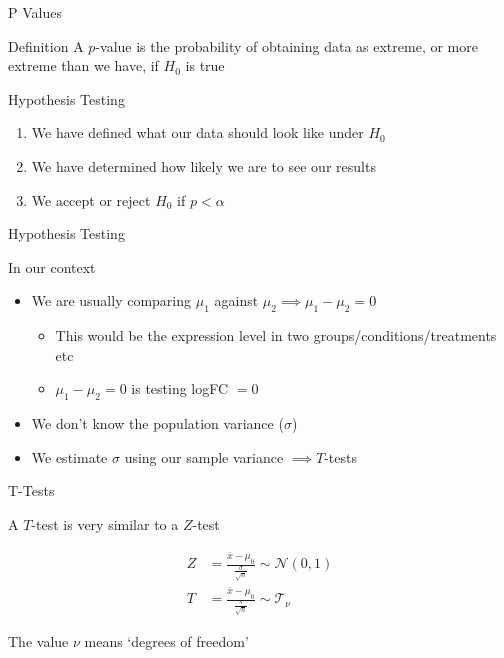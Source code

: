 \documentclass[aspectratio=169,11pt]{beamer}
\begin{document}
\begin{frame}{P Values}

	\begin{block}{Definition}
	A $p$-value is the probability of obtaining data as extreme, or more extreme than we have, if $H_0$ is true
	\end{block}

\end{frame}

\begin{frame}{Hypothesis Testing}

	\begin{enumerate}
		\item We have defined what our data should look like under $H_0$
		\item We have determined how likely we are to see our results
		\item We accept or reject $H_0$	if $p < \alpha$
	\end{enumerate}

\end{frame}

\begin{frame}{Hypothesis Testing}

In our context

	\begin{itemize}
		\item We are usually comparing $\mu_1$ against $\mu_2 \implies \mu_1 - \mu_2 = 0$
		\begin{itemize}
			\item This would be the expression level in two groups/conditions/treatments etc
			\item $\mu_1 - \mu_2 = 0$ is testing logFC $=0$
		\end{itemize}
		\pause
		\item We don't know the population variance ($\sigma$)
		\item We estimate $\sigma$ using our sample variance $\implies T$-tests
	\end{itemize}

\end{frame}

\begin{frame}{T-Tests}

A $T$-test is very similar to a $Z$-test

	\begin{align*}
		Z &= \frac{\bar{x} - \mu_0}{\frac{\sigma}{\sqrt{n}}} \sim \mathcal{N}(0, 1)\\
		T &= \frac{\bar{x} - \mu_0}{\frac{s}{\sqrt{n}}} \sim \mathcal{T}_{\nu}
	\end{align*}

The value $\nu$ means `degrees of freedom'

\end{frame}
\end{document}
